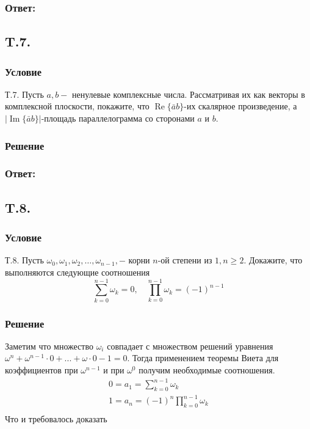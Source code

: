 \documentclass{article}
\begin{document}
\subsubsection*{Ответ:}

\subsection{T.7.}
\subsubsection*{Условие}
Т.7. Пусть $a, b-$ ненулевые комплексные числа. Рассматривая их как векторы в комплексной плоскости, покажите, что $\operatorname{Re}\{\bar{a} b\}$-их скалярное произведение, а $|\operatorname{Im}\{\bar{a} b\}|$-площадь параллелограмма со сторонами $a$ и $b$.
\subsubsection*{Решение}  
\subsubsection*{Ответ:}

\subsection{T.8.}
\subsubsection*{Условие}
Т.8. Пусть $\omega_{0}, \omega_{1}, \omega_{2}, \ldots, \omega_{n-1},-$ корни $n$-ой степени из $1, n \geq 2 .$ Докажите, что выполняются следующие соотношения
$$
\sum_{k=0}^{n-1} \omega_{k}=0, \quad \prod_{k=0}^{n-1} \omega_{k}=(-1)^{n-1}
$$
\subsubsection*{Решение}
Заметим что множество ${\omega_i}$ совпадает с множеством решений уравнения $\omega^n + \omega^{n-1} \cdot 0 + ... + \omega \cdot 0 - 1=0$. Тогда применением теоремы Виета для коэффициентов при $\omega^{n-1}$ и при $\omega^0$ получим необходимые соотношения.
\begin{gather*}
    0= a_1 = \sum_{k=0}^{n-1} \omega_{k}\\
    1 = a_n = (-1)^n \prod_{k=0}^{n-1} \omega_{k}\\
\end{gather*}
Что и требовалось доказать
\end{document}
